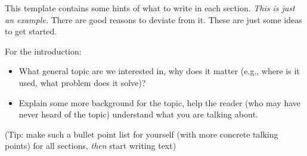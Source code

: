 This template contains some hints of what to write in each section.
\emph{This is just an example.} There are good reasons to deviate from it. These are just some ideas to get started. 

For the introduction:
\begin{itemize}
  \item What general topic are we interested in, why does it matter (e.g., where is it used, what problem does it solve)?
  \item Explain some more background for the topic, help the reader (who may have never heard of the topic) understand what you are talking about.
\end{itemize}
(Tip: make such a bullet point list for yourself (with more concrete talking points) for all sections, \emph{then} start writing text)
